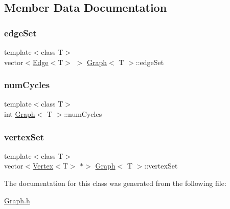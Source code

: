 \subsection{Member Data Documentation}
\mbox{\label{class_graph_a9cb12007e85c47011141b52cf565e0ed}} 
\subsubsection{\texorpdfstring{edge\+Set}{edgeSet}}
{\footnotesize\ttfamily template$<$class T$>$ \\
vector$<$\hyperlink{class_edge}{Edge}$<$T$>$ $>$ \hyperlink{class_graph}{Graph}$<$ T $>$\+::edge\+Set\hspace{0.3cm}{\ttfamily [private]}}

\mbox{\label{class_graph_ad5cc402f1b24d30ae12ffc2622ffbd5f}} 
\subsubsection{\texorpdfstring{num\+Cycles}{numCycles}}
{\footnotesize\ttfamily template$<$class T$>$ \\
int \hyperlink{class_graph}{Graph}$<$ T $>$\+::num\+Cycles\hspace{0.3cm}{\ttfamily [private]}}

\mbox{\label{class_graph_a73d4e735fc0a7c83c9c689a2b53fa623}} 
\subsubsection{\texorpdfstring{vertex\+Set}{vertexSet}}
{\footnotesize\ttfamily template$<$class T$>$ \\
vector$<$\hyperlink{class_vertex}{Vertex}$<$T$>$ $\ast$$>$ \hyperlink{class_graph}{Graph}$<$ T $>$\+::vertex\+Set\hspace{0.3cm}{\ttfamily [private]}}



The documentation for this class was generated from the following file\+:\begin{DoxyCompactItemize}
\item 
\hyperlink{_graph_8h}{Graph.\+h}\end{DoxyCompactItemize}
